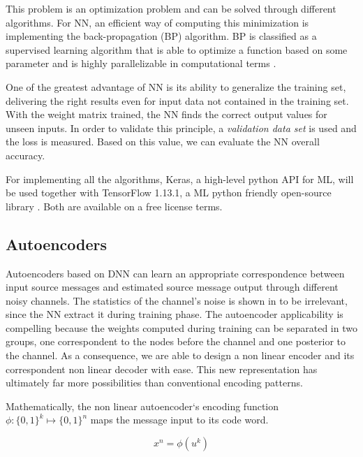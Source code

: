 \documentclass[conference]{IEEEtran}
\begin{document}
This problem is an optimization problem and can be solved through different algorithms. For NN, an efficient way of computing this minimization is implementing the back-propagation (BP) algorithm. 	BP is classified as a supervised learning algorithm that is able to optimize a function based on some parameter and is highly parallelizable in computational terms \cite{Ibnkahla}\cite{nielsenneural}.

One of the greatest advantage of NN is its ability to generalize the training set, delivering the right results even for input data not contained in the training set. With the weight matrix trained, the NN finds the correct output values for unseen inputs. In order to validate this principle, a \textit{validation data set} is used and the loss is measured. Based on this value, we can evaluate the NN overall accuracy.

For implementing all the algorithms, Keras, a high-level python API for ML, will be used together with TensorFlow 1.13.1, a ML python friendly open-source library \cite{DBLP:journals/corr/AbadiABBCCCDDDG16} \cite{chollet2015keras}. Both are available on a free license terms.




\subsection{Autoencoders}

Autoencoders based on DNN can learn an appropriate correspondence between input source messages and estimated source message output through different noisy channels. The statistics of the channel's noise is shown in \cite{2017arXiv171008379G} to be irrelevant, since the NN extract it during training phase. The autoencoder applicability is compelling because the weights computed during training can be separated in two groups, one correspondent to the nodes before the channel and one posterior to the channel. As a consequence, we are able to design a non linear encoder and its correspondent non linear decoder with ease. This new representation has ultimately far more possibilities than conventional encoding patterns.

Mathematically, the non linear autoencoder`s encoding function $\phi: \{0,1\}^k \mapsto \{0,1\}^n $ maps the message input to its code word. 

\begin{equation}
x^n = \phi (u^k)
\end{equation} 
\end{document}
